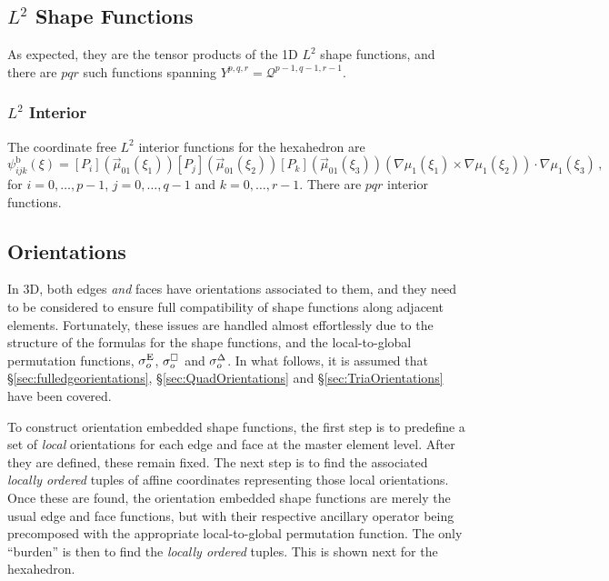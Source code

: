 \subsection{\texorpdfstring{$L^2$}{L2} Shape Functions}


As expected, they are the tensor products of the 1D $L^2$ shape functions, and there are $pqr$ such functions spanning $Y^{p,q,r}=\mathcal{Q}^{p-1,q-1,r-1}$.

\subsubsection{\texorpdfstring{$L^2$}{L2} Interior}

The coordinate free $L^2$ interior functions for the hexahedron are
\begin{equation}
    \psi_{ijk}^\mathrm{b}(\xi)=[P_i](\vec{\mu}_{01}(\xi_1))[P_j](\vec{\mu}_{01}(\xi_2))[P_k](\vec{\mu}_{01}(\xi_3))
    	(\nabla\mu_1(\xi_1)\!\!\times\!\!\nabla\mu_1(\xi_2))\!\cdot\!\nabla\mu_1(\xi_3)\,,
\end{equation}
for $i=0,\ldots,p-1$, $j=0,\ldots,q-1$ and $k=0,\ldots,r-1$. 
There are $pqr$ interior functions.
%

\subsection{Orientations}
\label{sec:HexaOrientations}

In 3D, both edges \textit{and} faces have orientations associated to them, and they need to be considered to ensure full compatibility of shape functions along adjacent elements.
Fortunately, these issues are handled almost effortlessly due to the structure of the formulas for the shape functions, and the local-to-global permutation functions, $\sigma_o^{\mathrm{E}}$, $\sigma_o^\square$ and $\sigma_o^\Delta$.
In what follows, it is assumed that \S\ref{sec:fulledgeorientations}, \S\ref{sec:QuadOrientations} and \S\ref{sec:TriaOrientations} have been covered.

To construct orientation embedded shape functions, the first step is to predefine a set of \textit{local} orientations for each edge and face at the master element level.
After they are defined, these remain fixed.
The next step is to find the associated \textit{locally ordered} tuples of affine coordinates representing those local orientations.
Once these are found, the orientation embedded shape functions are merely the usual edge and face functions, but with their respective ancillary operator being precomposed with the appropriate local-to-global permutation function.
The only ``burden'' is then to find the \textit{locally ordered} tuples.
This is shown next for the hexahedron.


